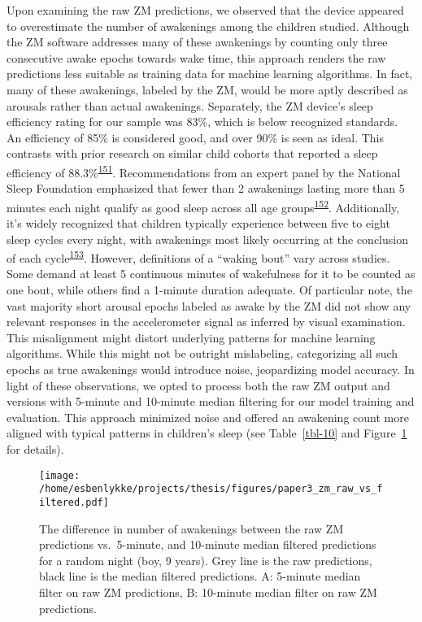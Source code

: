 \documentclass[
  10pt,
]{scrbook}
\begin{document}
\endgroup

Upon examining the raw ZM predictions, we observed that the device
appeared to overestimate the number of awakenings among the children
studied. Although the ZM software addresses many of these awakenings by
counting only three consecutive awake epochs towards wake time, this
approach renders the raw predictions less suitable as training data for
machine learning algorithms. In fact, many of these awakenings, labeled
by the ZM, would be more aptly described as arousals rather than actual
awakenings. Separately, the ZM device's sleep efficiency rating for our
sample was 83\%, which is below recognized standards. An efficiency of
85\% is considered good, and over 90\% is seen as ideal. This contrasts
with prior research on similar child cohorts that reported a sleep
efficiency of
88.3\%\textsuperscript{\protect\hyperlink{ref-galland_2018}{151}}.
Recommendations from an expert panel by the National Sleep Foundation
emphasized that fewer than 2 awakenings lasting more than 5 minutes each
night qualify as good sleep across all age
groups\textsuperscript{\protect\hyperlink{ref-ohayon_2017}{152}}.
Additionally, it's widely recognized that children typically experience
between five to eight sleep cycles every night, with awakenings most
likely occurring at the conclusion of each
cycle\textsuperscript{\protect\hyperlink{ref-galland_normal_2012}{153}}.
However, definitions of a ``waking bout'' vary across studies. Some
demand at least 5 continuous minutes of wakefulness for it to be counted
as one bout, while others find a 1-minute duration adequate. Of
particular note, the vast majority short arousal epochs labeled as awake
by the ZM did not show any relevant responses in the accelerometer
signal as inferred by visual examination. This misalignment might
distort underlying patterns for machine learning algorithms. While this
might not be outright mislabeling, categorizing all such epochs as true
awakenings would introduce noise, jeopardizing model accuracy. In light
of these observations, we opted to process both the raw ZM output and
versions with 5-minute and 10-minute median filtering for our model
training and evaluation. This approach minimized noise and offered an
awakening count more aligned with typical patterns in children's sleep
(see Table~\ref{tbl-10} and Figure~\ref{fig-paper3_raw_filt} for
details).

\begin{figure}

{\centering \texttt{[image: /home/esbenlykke/projects/thesis/figures/paper3\_zm\_raw\_vs\_filtered.pdf]}

}

\caption{\label{fig-paper3_raw_filt}The difference in number of
awakenings between the raw ZM predictions vs.~5-minute, and 10-minute
median filtered predictions for a random night (boy, 9 years). Grey line
is the raw predictions, black line is the median filtered predictions.
A: 5-minute median filter on raw ZM predictions, B: 10-minute median
filter on raw ZM predictions.}

\end{figure}
\end{document}
